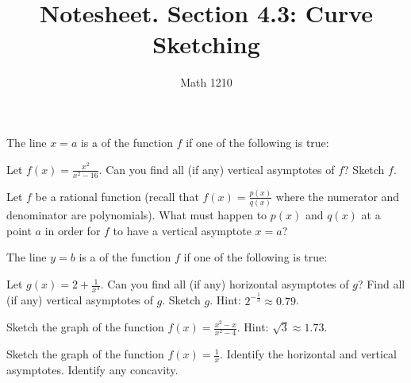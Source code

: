 \documentclass[12pt, a4paper]{article}
\author{Math 1210}
\title{Notesheet. Section 4.3: Curve Sketching}
\date{}
\begin{document}
\maketitle
\nameline
\begin{defi}
	The line $x=a$ is a  of the function $f$ if one of the following is true:
\end{defi}
\begin{ex}
	Let $f(x) = \frac{x^2}{x^2 - 16}$.  Can you find all (if any) vertical asymptotes of $f$?  Sketch $f$.
\end{ex}
\begin{ex}
	Let $f$ be a rational function (recall that $f(x) = \frac{p(x)}{q(x)}$ where the numerator and denominator are polynomials).  What must happen to $p(x)$ and $q(x)$ at a point $a$ in order for $f$ to have a vertical asymptote $x=a$?
\end{ex}
\pagebreak
\begin{defi}
	The line $y=b$ is a  of the function $f$ if one of the following is true:
\end{defi}
\begin{ex}
	Let $g(x) = 2 + \frac{1}{x^3}$.  Can you find all (if any)
        horizontal asymptotes of $g$?  Find all (if any) vertical
        asymptotes of $g$.  Sketch $g$. Hint: \(2^{-\frac{1}{3}}
        \approx 0.79\).
\end{ex}
\begin{ex}
	Sketch the graph of the function $f(x) = \frac{x^2 - x}{x^2 -
          4}$. Hint: \(\sqrt{3} \approx 1.73\).
\end{ex}
\begin{ex}
	Sketch the graph of the function $f(x) = \frac{1}{x}$.  Identify the horizontal and vertical asymptotes.  Identify any concavity.
\end{ex}




\end{document}
